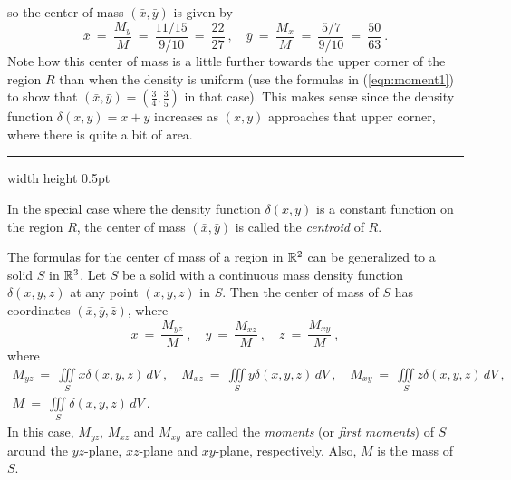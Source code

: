 \begin{exmp}
 so the center of mass $(\bar{x},\bar{y})$ is given by
 \begin{displaymath}
  \bar{x} ~=~ \frac{M_y}{M} ~=~ \frac{11/15}{9/10} ~=~ \frac{22}{27} ~, \quad
  \bar{y} ~=~ \frac{M_x}{M} ~=~ \frac{5/7}{9/10} ~=~ \frac{50}{63} ~.
 \end{displaymath}
 Note how this center of mass is a little further towards the upper corner of the region $R$ than when the density is
 uniform (use the formulas in (\ref{eqn:moment1}) to show that $(\bar{x},\bar{y}) =
 \left( \frac{3}{4},\frac{3}{5} \right)$ in that case). This makes sense since the density
 function $\delta(x,y) = x+y$ increases as $(x,y)$ approaches that upper corner, where there is quite a bit of area.
\end{exmp}
\hrule width \textwidth height 0.5pt
\medskip

In the special case where the density function $\delta(x,y)$ is a constant function on the region $R$, the center of
mass $(\bar{x},\bar{y})$ is called the \emph{centroid} of $R$.

The formulas for the center of mass of a region in $\mathbb{R}^{2}$ can be generalized to a solid $S$ in $\mathbb{R}^{3}$.
Let $S$ be a solid with a continuous mass density function $\delta(x,y,z)$ at any point $(x,y,z)$ in $S$. Then the
center of mass of $S$ has coordinates $(\bar{x},\bar{y},\bar{z})$, where
\begin{equation}\label{eqn:center3}
 \bar{x} ~=~ \frac{M_{yz}}{M} ~,\quad \bar{y} ~=~ \frac{M_{xz}}{M} ~,\quad \bar{z} ~=~ \frac{M_{xy}}{M} ~,
\end{equation}
where
\begin{gather}\label{eqn:moment3}
 M_{yz} ~=~ \iiint\limits_{S} x\delta(x,y,z)\,dV ~, \quad M_{xz} ~=~ \iiint\limits_{S} y\delta(x,y,z)\,dV ~, \quad
 M_{xy} ~=~ \iiint\limits_{S} z\delta(x,y,z)\,dV ~,\\M ~=~ \iiint\limits_{S} \delta(x,y,z)\,dV ~.
\end{gather}
In this case, $M_{yz}$, $M_{xz}$ and $M_{xy}$ are called the \emph{moments} (or \emph{first moments}) of $S$
around the $yz$-plane, $xz$-plane and $xy$-plane, respectively. Also, $M$ is the mass of $S$.


